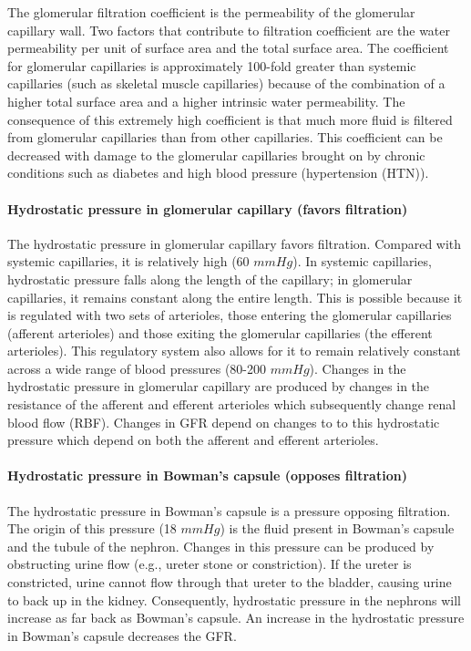 The glomerular filtration coefficient is the permeability of the glomerular capillary wall. Two factors that contribute to filtration coefficient are the water permeability per unit of surface area and the total surface area. The coefficient for glomerular capillaries is approximately 100-fold greater than systemic capillaries (such as skeletal muscle capillaries) because of the combination of a higher total surface area and a higher intrinsic water permeability. The consequence of this extremely high coefficient is that much more fluid is filtered from glomerular capillaries than from other capillaries. This coefficient can be decreased with damage to the glomerular capillaries brought on by chronic conditions such as diabetes and high blood pressure (hypertension (HTN)).

\paragraph{Hydrostatic pressure in glomerular capillary (favors filtration)}

The hydrostatic pressure in glomerular capillary favors filtration. Compared with systemic capillaries, it is relatively high (60 $mm Hg$). In systemic capillaries, hydrostatic pressure falls along the length of the capillary; in glomerular capillaries, it remains constant along the entire length. This is possible because it is regulated with two sets of arterioles, those entering the glomerular capillaries (afferent arterioles) and those exiting the glomerular capillaries (the efferent arterioles). This regulatory system also allows for it to remain relatively constant across a wide range of blood pressures (80-200 $mm Hg$).
Changes in the hydrostatic pressure in glomerular capillary are produced by changes in the resistance of the afferent and efferent arterioles which subsequently change renal blood flow (RBF). Changes in GFR depend on changes to to this hydrostatic pressure which depend on both the afferent and efferent arterioles.

\paragraph{Hydrostatic pressure in Bowman’s capsule (opposes filtration)}

The hydrostatic pressure in Bowman’s capsule is a pressure opposing filtration. The origin of this pressure (18 $mm Hg$) is the fluid present in Bowman’s capsule and the tubule of the nephron. Changes in this pressure can be produced by obstructing urine flow (e.g., ureter stone or constriction). If the ureter is constricted, urine cannot flow through that ureter to the bladder, causing urine to back up in the kidney. Consequently, hydrostatic pressure in the nephrons will increase as far back as Bowman’s capsule. An increase in the hydrostatic pressure in Bowman’s capsule decreases the GFR. 

